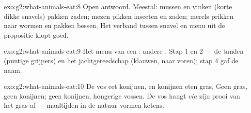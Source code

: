 \begin{solution}{exo:g2:what-animals-eat:8}
Open antwoord. Meestal: mussen en vinken (korte dikke snavels) pakken
zaden; mezen pikken insecten en zaden; merels prikken naar wormen en
pakken bessen. Het verband tussen snavel en menu uit de propositie
klopt goed.
\end{solution}

\begin{solution}{exo:g2:what-animals-eat:9}
Het menu van een : andere . Stap 1 en 2 --- de tanden
(puntige grijpers) en het jachtgereedschap (klauwen,  naar voren);
stap 4 gaf de naam.
\end{solution}

\begin{solution}{exo:g2:what-animals-eat:10}
De vos eet konijnen, en konijnen eten gras. Geen gras, geen konijnen;
geen konijnen, hongerige vossen. De vos hangt \emph{via} zijn prooi van
het gras af --- maaltijden in de natuur vormen ketens.
\end{solution}
